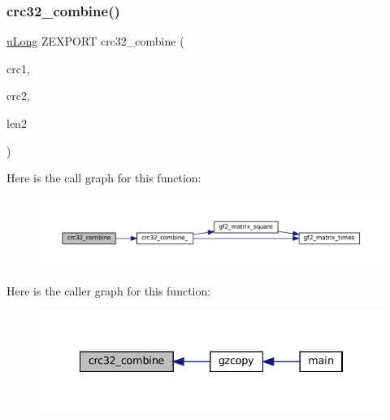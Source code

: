\subsubsection{\texorpdfstring{crc32\+\_\+combine()}{crc32\_combine()}}
{\footnotesize\ttfamily \mbox{\hyperlink{ioapi_8h_a50e9e9d5c30e481de822ad68fe537986}{u\+Long}} Z\+E\+X\+P\+O\+RT crc32\+\_\+combine (\begin{DoxyParamCaption}\item[{\mbox{\hyperlink{ioapi_8h_a50e9e9d5c30e481de822ad68fe537986}{u\+Long}}}]{crc1,  }\item[{\mbox{\hyperlink{ioapi_8h_a50e9e9d5c30e481de822ad68fe537986}{u\+Long}}}]{crc2,  }\item[{z\+\_\+off\+\_\+t}]{len2 }\end{DoxyParamCaption})}

Here is the call graph for this function\+:
\nopagebreak
\begin{figure}[H]
\begin{center}
\leavevmode
\includegraphics[width=350pt]{third-party_2zlib_2crc32_8c_aa7a1dc42a5d07c76263f4130f23d4515_cgraph}
\end{center}
\end{figure}
Here is the caller graph for this function\+:
\nopagebreak
\begin{figure}[H]
\begin{center}
\leavevmode
\includegraphics[width=334pt]{third-party_2zlib_2crc32_8c_aa7a1dc42a5d07c76263f4130f23d4515_icgraph}
\end{center}
\end{figure}
\mbox{\label{third-party_2zlib_2crc32_8c_ac14c100da9646dc4b3d1422ffe736829}} 
